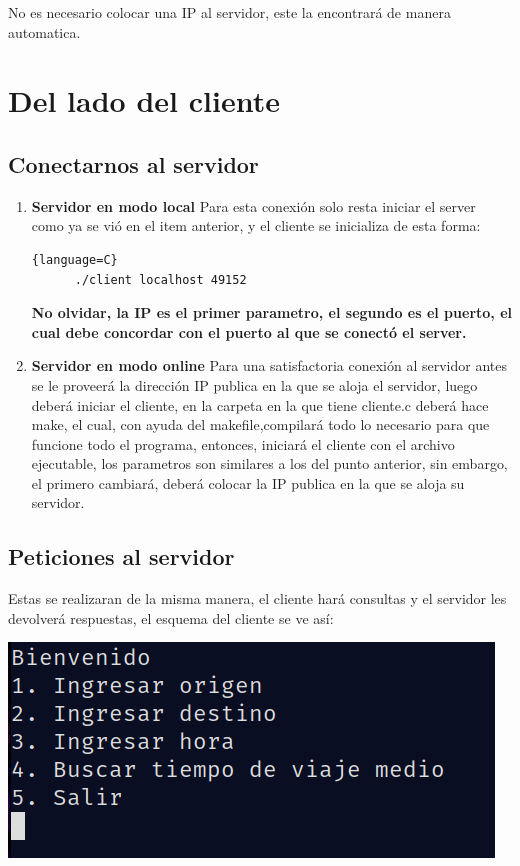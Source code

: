 \documentclass {article}
\begin{document}
No es necesario colocar una IP al servidor, este la encontrará de manera automatica.
\section{Del lado del cliente}
\subsection{Conectarnos al servidor}
\begin{enumerate}
  \item{\textbf{Servidor en modo local}}
    Para esta conexión solo resta iniciar el server como ya se vió en el item anterior, y el cliente se inicializa de esta forma:
    \begin{lstlisting}{language=C}
      ./client localhost 49152
    \end{lstlisting}
    \textbf{No olvidar, la IP es el primer parametro, el segundo es el puerto, el cual debe concordar con el puerto al que se conectó el server.}
    
  \item{\textbf{Servidor en modo online}}
Para una satisfactoria conexión al servidor antes se le proveerá la dirección IP publica en la que se aloja el servidor, luego deberá iniciar el cliente, en la carpeta en la que tiene cliente.c deberá hace make, el cual, con ayuda del makefile,compilará todo lo necesario para que funcione todo el programa, entonces, iniciará el cliente con el archivo ejecutable, los parametros son similares a los del punto anterior, sin embargo, el primero cambiará, deberá colocar la IP publica en la que se aloja su servidor.
\end{enumerate}

\subsection{Peticiones al servidor}
Estas se realizaran de la misma manera, el cliente hará consultas y el servidor les devolverá respuestas, el esquema del cliente se ve así:\\

  \begin{center}
    \includegraphics[scale=0.2]{cliente}
  \end{center}




\end{document}
